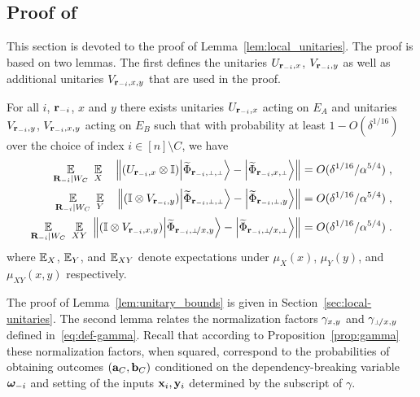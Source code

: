 \subsection{Proof of }
\label{sec:anchorpr_main_lemma}

This section is devoted to the proof of Lemma~\ref{lem:local_unitaries}. The proof is based on two lemmas. The first defines the unitaries $U_{\mathbf{r}_{-i},x}$, $V_{\mathbf{r}_{-i},y}$ as well as additional unitaries $V_{\mathbf{r}_{-i},x,y}$ that are used in the proof. %

\begin{lemma}
\label{lem:unitary_bounds}
For all $i$, $\mathbf{r}_{-i}$, $x$ and $y$ there exists unitaries $U_{\mathbf{r}_{-i}, x}$ acting on $E_A$ and unitaries $V_{\mathbf{r}_{-i}, y}$, $V_{{\mathbf{r}_{-i} , x,y}}$ acting on $E_B$ such that with probability at least $1 - O(\delta^{1/16})$ over the choice of index $i \in [n] \setminus C$, we have
\begin{align}
	\Ex_{\bR_\mi | W_C} \,\, \Ex_X \,\,\,\, \, \, \left \|(U_{\br_\mi, x} \otimes \Id)  \bigket{\wt{\Phi}_\sspp} - \bigket{\wt{\Phi}_\ssxp }   \right \| &=  O(\delta^{1/16}/\alpha^{5/4})\;,\label{eq:ux_bound}\\
	\Ex_{\bR_\mi | W_C} \,\, \Ex_Y \,\, \,\, \, \, \left \| (\Id \otimes V_{\br_\mi,y})  \bigket{\wt{\Phi}_\sspp}  - \bigket{\wt{\Phi}_\sspy }  \right \| &=  O(\delta^{1/16}/\alpha^{5/4})\;,\label{eq:vy_bound}\\
	\Ex_{\bR_\mi | W_C} \,\, \Ex_{XY} \,\,  \left \|  (\Id \otimes V_{\ssxy})  \bigket{\wt{\Phi}_\sspxy}  - \bigket{\wt{\Phi}_\sspxp }  \right \| &=  O(\delta^{1/16}/\alpha^{5/4})\;.\label{eq:vxy_bound}
		\end{align}
		where $\operatorname*{\mathbb{E}}_X$, $\operatorname*{\mathbb{E}}_Y$, and $\operatorname*{\mathbb{E}}_{XY}$ denote expectations under $\mu_X(x)$, $\mu_Y(y)$, and $\mu_{XY}(x,y)$ respectively.
\end{lemma}

The proof of Lemma~\ref{lem:unitary_bounds} is given in Section~\ref{sec:local-unitaries}.
The second lemma relates the normalization factors $\gamma_{x,y}$ and $\gamma_{\pxy}$ defined in~\eqref{eq:def-gamma}. Recall that according to Proposition~\ref{prop:gamma} these normalization factors, when squared, correspond to the probabilities of obtaining outcomes $(\mathbf{a}_C,\mathbf{b}_C)$ conditioned on the dependency-breaking variable ${\boldsymbol{\omega}}_{-i}$ and setting of the inputs $\mathbf{x}_i,\mathbf{y}_i$ determined by the subscript of $\gamma$.

